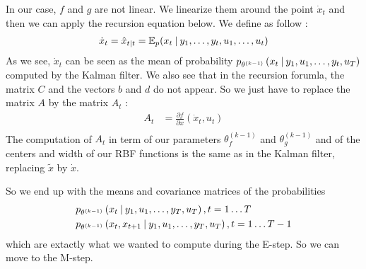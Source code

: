In our case, $f$ and $g$ are not linear.
We linearize them around the point $\dot{x}_t$ and then we can apply the recursion equation below.
We define  as follow :
\begin{align*}
  \dot{x}_t &= \hat{x}_{t \mathbin{\vert} t} = \mathbb{E}_p(x_t \mathbin{\vert} y_1, \ldots , y_t, u_1, \ldots , u_t) \\
\end{align*}
As we see, $\dot{x}_t$ can be seen as the mean of probability  $p_{\theta^{(k-1)}}\left(x_t \mathbin{\vert} y_1, u_1, \ldots, y_t, u_T \right)$ computed by the Kalman filter.
We also see that in the recursion forumla, the matrix $C$ and the vectors $b$ and $d$ do not appear.
So we just have to replace the matrix $A$ by the matrix $A_t$ :
\begin{align*}
  A_t &= \frac{\partial f}{\partial x}(\dot{x}_t, u_t)\\
\end{align*}
The computation of $A_t$ in term of our parameters $\theta_f^{(k-1)}$ and $\theta_g^{(k-1)}$ and of the centers and width of our RBF functions is the same as in the Kalman filter, replacing $\tilde{x}$ by $\dot{x}$.

So we end up with the means and covariance matrices of the probabilities
\begin{align*}
  &p_{\theta^{(k-1)}}\left(x_t \mathbin{\vert} y_1, u_1, \ldots, y_T, u_T \right), t=1 \ldots T\\
  &p_{\theta^{(k-1)}}\left(x_t, x_{t+1} \mathbin{\vert} y_1, u_1, \ldots, y_T, u_T \right), t=1 \ldots T-1\\
\end{align*}
which are extactly what we wanted to compute during the E-step.
So we can move to the M-step.
